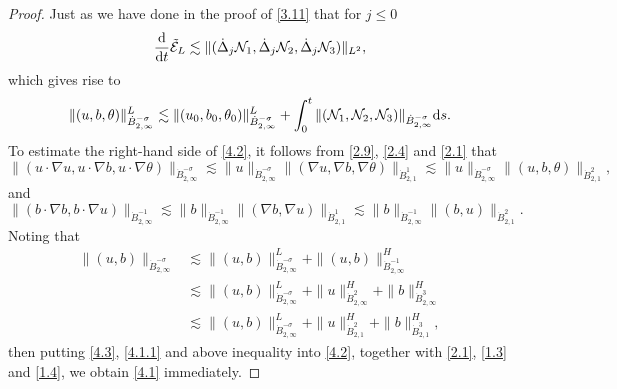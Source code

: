\documentclass[reqno]{amsart}
\begin{document}
\begin{proof}
Just as we have done in the proof of \eqref{3.11} that for $j\leqslant0$
\[
\frac{\rm d}{{\rm d}t} \tilde{\mathcal{E}}_L
\lesssim\|(\dot{\Delta}_j \mathcal{N}_1,\dot{\Delta}_j \mathcal{N}_2,\dot{\Delta}_j 
\mathcal{N}_3)\|_{L^2},
\]
which gives rise to
\begin{equation}\label{4.2}
 \|(u,b,\theta)\|^L_{\dot{B}^{-\sigma}_{2,\infty}}
 \lesssim\|(u_0,b_0,\theta_0)\|^L_{\dot{B}^{-\sigma}_{2,\infty}}
 +\int_0^t\|( \mathcal{N}_1, \mathcal{N}_2, 
 \mathcal{N}_3)\|_{\dot{B}^{-\sigma}_{2,\infty}}{\rm d}s.
\end{equation}
To estimate the right-hand side of \eqref{4.2}, it follows from \eqref{2.9}, \eqref{2.4} 
and \eqref{2.1} that
 \begin{equation}\label{4.3}
 \|(u\cdot\nabla u,u\cdot\nabla b,u\cdot\nabla 
  \theta)\|_{\dot{B}^{-\sigma}_{2,\infty}}
\lesssim \|u\|_{\dot{B}^{-\sigma}_{2,\infty}}\|(\nabla u,\nabla b,
 \nabla\theta)\|_{\dot{B}^{1}_{2,1}} 
\lesssim \|u\|_{\dot{B}^{-\sigma}_{2,\infty}}\|( u, b,\theta)\|_{\dot{B}^{2}_{2,1}},
\end{equation}
and
 \begin{equation}\label{4.1.1}
\|(b\cdot\nabla b,b\cdot\nabla u)\|_{\dot{B}^{-1}_{2,\infty}}
\lesssim \|b\|_{\dot{B}^{-1}_{2,\infty}}\|(\nabla b,\nabla u)\|_{\dot{B}^{1}_{2,1}} 
\lesssim \|b\|_{\dot{B}^{-1}_{2,\infty}}\|( b, u)\|_{\dot{B}^{2}_{2,1}}.
\end{equation}
Noting that
\begin{align*}
 \|(u,b)\|_{\dot{B}^{-\sigma}_{2,\infty}}
&\lesssim \|(u,b)\|_{\dot{B}^{-\sigma}_{2,\infty}}^L
  +\|(u,b)\|_{\dot{B}^{-1}_{2,\infty}}^H \\
&\lesssim \|(u,b)\|_{\dot{B}^{-\sigma}_{2,\infty}}^L
  +\|u\|_{\dot{B}^{2}_{2,\infty}}^H+\|b\|_{\dot{B}^{3}_{2,\infty}}^H \\
&\lesssim \|(u,b)\|_{\dot{B}^{-\sigma}_{2,\infty}}^L+\|u\|_{\dot{B}^{2}_{2,1}}^H
  +\|b\|_{\dot{B}^{3}_{2,1}}^H,
\end{align*}
then putting \eqref{4.3}, \eqref{4.1.1} and above inequality into \eqref{4.2}, 
together with \eqref{2.1}, \eqref{1.3} and \eqref{1.4}, we obtain \eqref{4.1} 
immediately.
\end{proof}
\end{document}
